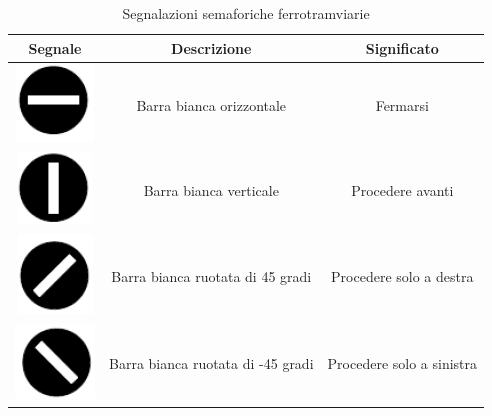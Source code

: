 \begin{table}
\begin{tabular}{|c|c|c|}
	\hline 
	\textbf{Segnale} & \textbf{Descrizione} & \textbf{Significato} \\

	\hline
	\includegraphics{img/stopsemaphore}& Barra bianca orizzontale & Fermarsi \\ 
	\hline 
	\includegraphics{img/gosemaphore}& Barra bianca verticale  & Procedere avanti \\ 
	\hline 
	\includegraphics{img/rightsemaphore}& Barra bianca ruotata di 45 gradi & Procedere solo a destra \\ 
	\hline 
	\includegraphics{img/leftsemaphore}& Barra bianca ruotata di -45 gradi & Procedere solo a sinistra \\ 
	\hline 
\end{tabular} 
\caption{Segnalazioni semaforiche ferrotramviarie}
\label{tab:sem}
\end{table}